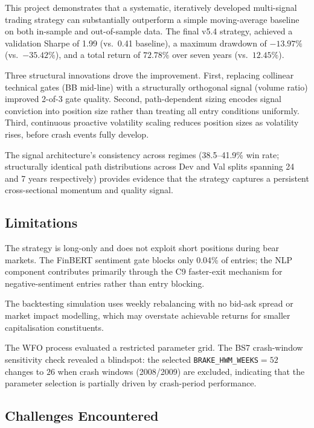 \documentclass[11pt,twoside,a4paper]{article}
\begin{document}
This project demonstrates that a systematic, iteratively developed multi-signal trading strategy can substantially outperform a simple moving-average baseline on both in-sample and out-of-sample data. The final v5.4 strategy, achieved a validation Sharpe of 1.99 (vs.\ 0.41 baseline), a maximum drawdown of $-13.97\%$ (vs.\ $-35.42\%$), and a total return of $72.78\%$ over seven years (vs.\ $12.45\%$).

Three structural innovations drove the improvement. First, replacing collinear technical gates (BB mid-line) with a structurally orthogonal signal (volume ratio) improved 2-of-3 gate quality. Second, path-dependent sizing encodes signal conviction into position size rather than treating all entry conditions uniformly. Third, continuous proactive volatility scaling reduces position sizes as volatility rises, before crash events fully develop.

The signal architecture's consistency across regimes (38.5--41.9\% win rate; structurally identical path distributions across Dev and Val splits spanning 24 and 7 years respectively) provides evidence that the strategy captures a persistent cross-sectional momentum and quality signal.

\subsection{Limitations}

The strategy is long-only and does not exploit short positions during bear markets. The FinBERT sentiment gate blocks only 0.04\% of entries; the NLP component contributes primarily through the C9 faster-exit mechanism for negative-sentiment entries rather than entry blocking.

The backtesting simulation uses weekly rebalancing with no bid-ask spread or market impact modelling, which may overstate achievable returns for smaller capitalisation constituents.

The WFO process evaluated a restricted parameter grid. The BS7 crash-window sensitivity check revealed a blindspot: the selected \texttt{BRAKE\_HWM\_WEEKS}$=52$ changes to $26$ when crash windows (2008/2009) are excluded, indicating that the parameter selection is partially driven by crash-period performance.

\subsection{Challenges Encountered}
\end{document}
